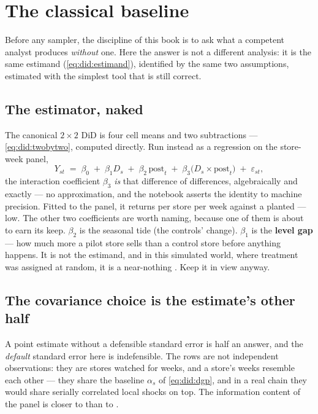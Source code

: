 \section{The classical baseline}
\label{sec:did:classical}

Before any sampler, the discipline of this book is to ask what a competent analyst produces
\emph{without} one. Here the answer is not a different analysis: it is the same estimand
(\cref{eq:did:estimand}), identified by the same two assumptions, estimated with the simplest tool
that is still correct.

\subsection*{The estimator, naked}

The canonical $2 \times 2$ DiD is four cell means and two subtractions ---
\cref{eq:did:twobytwo}, computed directly. Run instead as a regression on the store-week panel,
%
\begin{equation}
  Y_{st}
  \;=\;
  \beta_0
  \;+\; \beta_1 D_s
  \;+\; \beta_2 \,\text{post}_t
  \;+\; \beta_3 \big(D_s \times \text{post}_t\big)
  \;+\; \varepsilon_{st},
  \label{eq:did:ols}
\end{equation}
%
the interaction coefficient $\beta_3$ \emph{is} that difference of differences, algebraically and
exactly --- no approximation, and the notebook asserts the identity to machine precision. Fitted to
the panel, it returns \eur{\nbEightAttCl} per store per week against a planted
\eur{\nbEightTrueEffect} --- \eur{\nbEightAttClErrAbs} low. The other two coefficients are worth
naming, because one of them is about to earn its keep. $\beta_2$ is the seasonal tide (the
controls' change). $\beta_1$ is the \textbf{level gap} --- how much more a pilot store sells than a
control store before anything happens. It is not the estimand, and in this simulated world, where
treatment was assigned at random, it is a near-nothing \eur{\nbEightLvlEst}. Keep it in view
anyway.

\subsection*{The covariance choice is the estimate's other half}

A point estimate without a defensible standard error is half an answer, and the \emph{default}
standard error here is indefensible. The \nbEightNObs{} rows are not \nbEightNObs{} independent
observations: they are \nbEightNStores{} stores watched for \nbEightNWeeks{} weeks, and a store's
weeks resemble each other --- they share the baseline $\alpha_s$ of \cref{eq:did:dgp}, and in a
real chain they would share serially correlated local shocks on top. The information content of the
panel is closer to \nbEightNStores{} than to \nbEightNObs.

